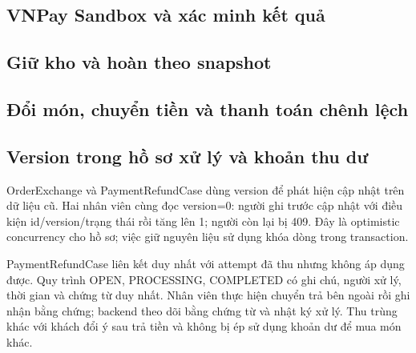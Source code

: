 \subsection{VNPay Sandbox và xác minh kết quả}


\subsection{Giữ kho và hoàn theo snapshot}


\subsection{Đổi món, chuyển tiền và thanh toán chênh lệch}


\subsection{Version trong hồ sơ xử lý và khoản thu dư}
OrderExchange và PaymentRefundCase dùng version để phát hiện cập nhật trên dữ liệu cũ. Hai nhân viên cùng đọc version=0: người ghi trước cập nhật với điều kiện id/version/trạng thái rồi tăng lên 1; người còn lại bị 409. Đây là optimistic concurrency cho hồ sơ; việc giữ nguyên liệu sử dụng khóa dòng trong transaction.

PaymentRefundCase liên kết duy nhất với attempt đã thu nhưng không áp dụng được. Quy trình OPEN, PROCESSING, COMPLETED có ghi chú, người xử lý, thời gian và chứng từ duy nhất. Nhân viên thực hiện chuyển trả bên ngoài rồi ghi nhận bằng chứng; backend theo dõi bằng chứng từ và nhật ký xử lý. Thu trùng khác với khách đổi ý sau trả tiền và không bị ép sử dụng khoản dư để mua món khác.
